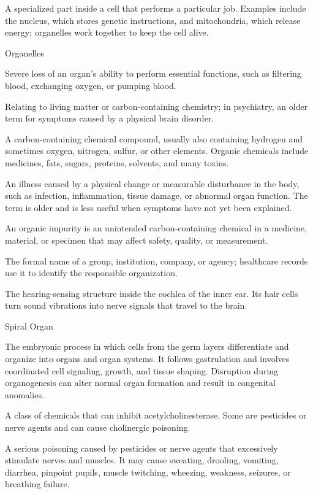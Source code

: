  A specialized part inside a cell that performs a particular job. Examples include the nucleus, which stores genetic instructions, and mitochondria, which release energy; organelles work together to keep the cell alive.

\synonyms
Organelles

 Severe loss of an organ's ability to perform essential functions, such as filtering blood, exchanging oxygen, or pumping blood.

 Relating to living matter or carbon-containing chemistry; in psychiatry, an older term for symptoms caused by a physical brain disorder.

 A carbon-containing chemical compound, usually also containing hydrogen and sometimes oxygen, nitrogen, sulfur, or other elements. Organic chemicals include medicines, fats, sugars, proteins, solvents, and many toxins.

 An illness caused by a physical change or measurable disturbance in the body, such as infection, inflammation, tissue damage, or abnormal organ function. The term is older and is less useful when symptoms have not yet been explained.

 An organic impurity is an unintended carbon-containing chemical in a medicine, material, or specimen that may affect safety, quality, or measurement.

 The formal name of a group, institution, company, or agency; healthcare records use it to identify the responsible organization.

 The hearing-sensing structure inside the cochlea of the inner ear. Its hair cells turn sound vibrations into nerve signals that travel to the brain.

\synonyms
Spiral Organ

 The embryonic process in which cells from the germ layers differentiate and organize into organs and organ systems.
It follows gastrulation and involves coordinated cell signaling, growth,
and tissue shaping. Disruption during organogenesis can alter normal organ
formation and result in congenital anomalies.

 A class of chemicals that can inhibit acetylcholinesterase. Some are pesticides or nerve agents and can cause cholinergic poisoning.

 A serious poisoning caused by pesticides or nerve agents that excessively stimulate nerves and muscles. It may cause sweating, drooling, vomiting, diarrhea, pinpoint pupils, muscle twitching, wheezing, weakness, seizures, or breathing failure.

